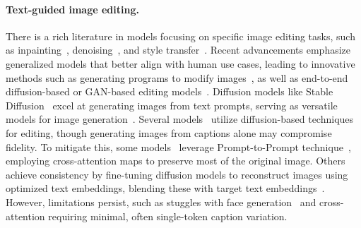 \paragraph{Text-guided image editing.}
There is a rich literature in models focusing on specific image editing tasks, such as inpainting~\cite{yu2018generative}, denoising~\cite{goyal2020image}, and style transfer~\cite{gatys2016image}.
Recent advancements emphasize generalized models that better align with human use cases, leading to innovative methods such as generating programs to modify images~\cite{gupta2023visual}, as well as end-to-end diffusion-based or GAN-based editing models~\cite{karras2019style, patashnik2021styleclip, avrahami2022blended, meng2021sdedit, wang2023imagen, xie2023smartbrush}. Diffusion models like Stable Diffusion~\cite{rombach2022high} excel at generating images from text prompts,
serving as versatile models for image generation~\cite{zhan2023multimodal}.
Several models~\cite{brooks2023instructpix2pix, mokady2023null, kawar2023imagic} utilize diffusion-based techniques for editing, though generating images from captions alone may compromise fidelity. To mitigate this, some models~\cite{brooks2023instructpix2pix, mokady2023null, zhang2024magicbrush, krojer2024learning} leverage Prompt-to-Prompt technique~\cite{hertz2022prompt}, employing cross-attention maps to preserve most of the original image. Others achieve consistency by fine-tuning diffusion models to reconstruct images using optimized text embeddings, blending these with target text embeddings~\cite{kawar2023imagic}.
However, limitations persist, such as stuggles with face generation~\cite{borji2022generated} and cross-attention requiring minimal, often single-token caption variation.


